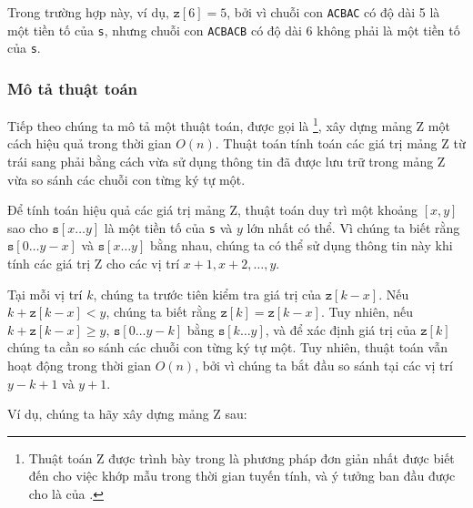 Trong trường hợp này, ví dụ, $\texttt{z}[6]=5$,
bởi vì chuỗi con \texttt{ACBAC} có độ dài 5
là một tiền tố của \texttt{s},
nhưng chuỗi con \texttt{ACBACB} có độ dài 6
không phải là một tiền tố của \texttt{s}.

\subsubsection*{Mô tả thuật toán}

Tiếp theo chúng ta mô tả một thuật toán,
được gọi là \footnote{Thuật toán Z
được trình bày trong \cite{gus97} là phương pháp đơn giản nhất được biết đến
cho việc khớp mẫu trong thời gian tuyến tính, và ý tưởng ban đầu
được cho là của \cite{mai84}.},
xây dựng mảng Z một cách hiệu quả trong thời gian $O(n)$.
Thuật toán tính toán các giá trị mảng Z
từ trái sang phải bằng cách vừa sử dụng thông tin
đã được lưu trữ trong mảng Z vừa so sánh các chuỗi con
từng ký tự một.

Để tính toán hiệu quả các giá trị mảng Z,
thuật toán duy trì một khoảng $[x,y]$ sao cho
$\texttt{s}[x \ldots y]$ là một tiền tố của \texttt{s}
và $y$ lớn nhất có thể.
Vì chúng ta biết rằng $\texttt{s}[0 \ldots y-x]$
và $\texttt{s}[x \ldots y]$ bằng nhau,
chúng ta có thể sử dụng thông tin này khi tính
các giá trị Z cho các vị trí $x+1,x+2,\ldots,y$.

Tại mỗi vị trí $k$, chúng ta trước tiên
kiểm tra giá trị của $\texttt{z}[k-x]$.
Nếu $k+\texttt{z}[k-x]<y$, chúng ta biết rằng $\texttt{z}[k]=\texttt{z}[k-x]$.
Tuy nhiên, nếu $k+\texttt{z}[k-x] \ge y$,
$\texttt{s}[0 \ldots y-k]$ bằng
$\texttt{s}[k \ldots y]$, và để xác định
giá trị của $\texttt{z}[k]$ chúng ta cần so sánh
các chuỗi con từng ký tự một.
Tuy nhiên, thuật toán vẫn hoạt động trong thời gian $O(n)$,
bởi vì chúng ta bắt đầu so sánh tại các vị trí
$y-k+1$ và $y+1$.

Ví dụ, chúng ta hãy xây dựng mảng Z sau:

